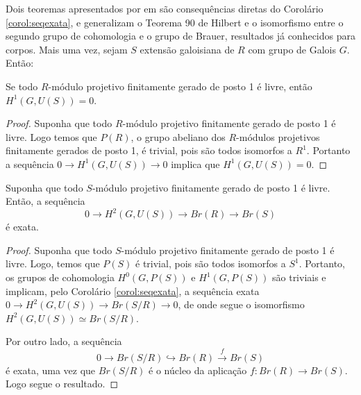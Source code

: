 Dois teoremas apresentados por \citeauthor{brauer} em \cite{brauer} são consequências diretas do Corolário \ref{corol:seqexata}, e generalizam o Teorema 90 de Hilbert e o isomorfismo entre o segundo grupo de cohomologia e o grupo de Brauer, resultados já conhecidos para corpos. Mais uma vez, sejam $S$ extensão galoisiana de $R$ com grupo de Galois $G$. Então:
\begin{corol}\cite[Theorem A.9.]{brauer}
Se todo $R$-módulo projetivo finitamente gerado de posto 1 é livre, então $H^1(G,U(S)) = 0$.
\begin{proof}
Suponha que todo $R$-módulo projetivo finitamente gerado de posto 1 é livre. Logo temos que $P(R)$, o grupo abeliano dos $R$-módulos projetivos finitamente gerados de posto 1, é trivial, pois são todos isomorfos a $R^1$. Portanto a sequência $0 \rightarrow H^1(G,U(S)) \rightarrow 0$ implica que $H^1(G,U(S)) = 0$.
\end{proof}
\end{corol}
\begin{corol}\cite[Theorem A.15.]{brauer}
Suponha que todo $S$-módulo projetivo finitamente gerado de posto 1 é livre. Então, a sequência \[0 \rightarrow H^2(G,U(S)) \rightarrow Br(R) \rightarrow Br(S)\] é exata.
\begin{proof}
Suponha que todo $S$-módulo projetivo finitamente gerado de posto 1 é livre. Logo, temos que $P(S)$ é trivial, pois são todos isomorfos a $S^1$. Portanto, os grupos de cohomologia $H^0(G,P(S))$ e $H^1(G,P(S))$ são triviais e implicam, pelo Corolário \ref{corol:seqexata}, a sequência exata $0 \rightarrow H^2(G,U(S)) \rightarrow Br(S/R) \rightarrow 0$, de onde segue o isomorfismo $H^2(G,U(S)) \simeq Br(S/R)$.\par
Por outro lado, a sequência \[0 \rightarrow Br(S/R) \hookrightarrow Br(R) \xrightarrow{f} Br(S)\] é exata, uma vez que $Br(S/R)$ é o núcleo da aplicação $f: Br(R) \rightarrow Br(S)$. Logo segue o resultado.
 
\end{proof}
\end{corol}